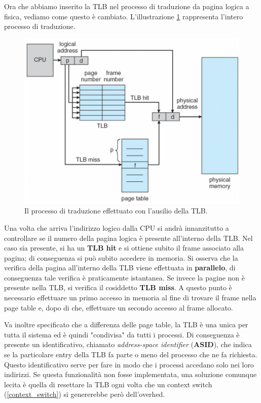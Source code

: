 Ora che abbiamo inserito la TLB nel processo di traduzione da pagina logica a fisica, vediamo come questo è cambiato. L'illustrazione \ref{fig:paging_hardware_TLB} rappresenta l'intero processo di traduzione.
\begin{figure}[h]
    \centering
    \includegraphics[width = .7\textwidth]{../res/imgs/main memory/paging_hardware_TLB.png}
    \caption{Il processo di traduzione effettuato con l'ausilio della TLB.}
    \label{fig:paging_hardware_TLB}
\end{figure}
Una volta che arriva l'indirizzo logico dalla CPU si andrà innanzitutto a controllare se il numero della pagina logica è presente all'interno della TLB. Nel caso sia presente, si ha un \textbf{TLB hit} e si ottiene subito il frame associato alla pagina; di conseguenza si può subito accedere in memoria. Si osserva che la verifica della pagina all'interno della TLB viene effettuata in \textbf{parallelo}, di conseguenza tale verifica è praticamente istantanea. Se invece la pagine non è presente nella TLB, si verifica il cosiddetto \textbf{TLB miss}. A questo punto è necessario effettuare un primo accesso in memoria al fine di trovare il frame nella page table e, dopo di che, effettuare un secondo accesso al frame allocato. 

Va inoltre specificato che a differenza delle page table, la TLB è una unica per tutta il sistema ed è quindi "condivisa" da tutti i processi. Di conseguenza è presente un identificativo, chiamato \textit{address-space identifier} (\textbf{ASID}), che indica se la particolare entry della TLB fa parte o meno del processo che ne fa richiesta. Questo identificativo serve per fare in modo che i processi accedano solo nei loro indirizzi. Se questa funzionalità non fosse implementata, una soluzione comunque lecita è quella di resettare la TLB ogni volta che un context switch (\ref{context_switch}) si genererebbe però dell'overhed.

